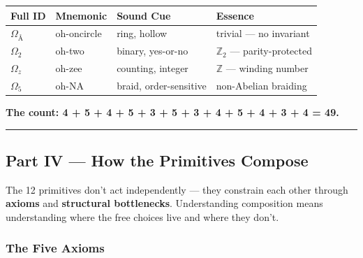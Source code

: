 \documentclass[12pt,a4paper]{article}
\begin{document}
\begin{table}[htbp]
\centering
\small
{}
\begin{tabularx}{\textwidth}{>{\centering\arraybackslash}X >{\centering\arraybackslash}X >{\centering\arraybackslash}X >{\centering\arraybackslash}X}
\toprule
\rowcolor{gray!25}\textbf{Full ID} & \textbf{Mnemonic} & \textbf{Sound Cue} & \textbf{Essence} \\
\midrule
\rowcolors{1}{white}{gray!10}
$\Omega_{\text{Å}}$ & oh-oncircle & ring, hollow & trivial --- no invariant \\
$\Omega_{2}$ & oh-two & binary, yes-or-no & $\mathbb{Z}_2$ --- parity-protected \\
$\Omega_{z}$ & oh-zee & counting, integer & $\mathbb{Z}$ --- winding number \\
$\Omega_{5}$ & oh-NA & braid, order-sensitive & non-Abelian braiding \\
\bottomrule
\end{tabularx}
\end{table}

\textbf{The count: 4 + 5 + 4 + 5 + 3 + 5 + 3 + 4 + 5 + 4 + 3 + 4 = 49.}

\begin{center}
\rule{0.5\textwidth}{0.4pt}
\end{center}

\subsection{Part IV --- How the Primitives Compose}

The 12 primitives don't act independently --- they constrain each other through \textbf{axioms} and \textbf{structural bottlenecks}. Understanding composition means understanding where the free choices live and where they don't.

\subsubsection{The Five Axioms}
\end{document}
